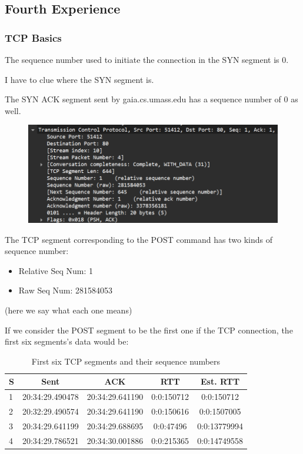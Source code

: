 \subsection{Fourth Experience}

\subsubsection{TCP Basics}

The sequence number used to initiate the connection in the SYN segment is 0.

I have to clue where the SYN segment is.

The SYN ACK segment sent by gaia.cs.umass.edu has a sequence number of 0 as
well.

\begin{figure}[htbp]
	\centering
	\includegraphics[width=1\linewidth]{img/fourth_experience/1.png}
	\caption{}\label{fig:4_1}
\end{figure}

The TCP segment corresponding to the POST command has two kinds of sequence
number:

\begin{itemize}
	\item Relative Seq Num: 1
	\item Raw Seq Num: 281584053
\end{itemize}

(here we say what each one means)

If we consider the POST segment to be the first one if the TCP connection, the
first six segments's data would be:

\begin{table}[htbp]
	\centering
	\begin{tabular}{|p{0.3cm}|c|c|c|c|}
		\hline
		S & Sent            & ACK             & RTT        & Est. RTT     \\
		\hline
		1 & 20:34:29.490478 & 20:34:29.641190 & 0:0:150712 & 0:0:150712   \\
		2 & 20:32:29.490574 & 20:34:29.641190 & 0:0:150616 & 0:0:1507005  \\
		3 & 20:34:29.641199 & 20:34:29.688695 & 0:0:47496  & 0:0:13779994 \\
		4 & 20:34:29.786521 & 20:34:30.001886 & 0:0:215365 & 0:0:14749558 \\
		\hline
	\end{tabular}
	\caption{First six TCP segments and their sequence numbers}
	\label{tab:tcp_segments}
\end{table}


